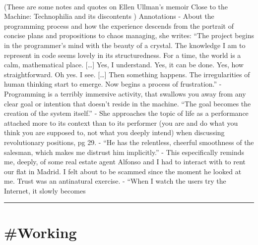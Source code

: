 \documentclass[10pt,a4paper]{article}
\begin{document}
\begin{multicols*}{2}
\paragraph{}
(These are some notes and quotes on Ellen Ullman’s memoir Close to the Machine: Technophilia and its discontents )
Annotations
- About the programming process and how the experience descends from the portrait of concise plans and propositions to chaos managing, she writes:
“The project begins in the programmer’s mind with the beauty of a crystal. The knowledge I am to represent in code seems lovely in its structuredness. For a time, the world is a calm, mathematical place. […] Yes, I understand. Yes, it can be done. Yes, how straightforward. Oh yes. I see. […] Then something happens. The irregularities of human thinking start to emerge. Now begins a process of frustration.”
- Programming is a terribly immersive activity, that swallows you away from any clear goal or intention that doesn’t reside in the machine. “The goal becomes the creation of the system itself.”
- She approaches the topic of life as a performance attached more to its context than to its performer (you are and do what you think you are supposed to, not what you deeply intend) when discussing revolutionary positions, pg 29.
- “He has the relentless, cheerful smoothness of the salesman, which makes me distrust him implicitly.” - This especifically reminds me, deeply, of some real estate agent Alfonso and I had to interact with to rent our flat in Madrid. I felt about to be scammed since the moment he looked at me. Trust was an antinatural exercise.
- “When I watch the users try the Internet, it slowly becomes 
\par\noindent\textcolor{red}{\rule{\linewidth}{0.2mm}}
\vfill
\null
\end{multicols*}

\newpage
\section{\#Working}
\end{document}
